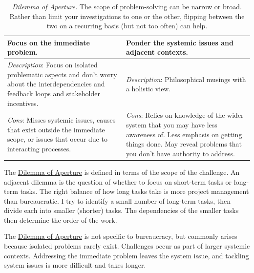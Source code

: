 \begin{center}
\begin{table}[H] %
\begin{tabular}{ | m{\dilemmatablewidth}| m{\dilemmatablewidth} | } 
  \hline
  \textbf{Focus on the immediate problem.} &
  \textbf{Ponder the systemic issues and adjacent contexts.} \\
  \hline
  \textit{Description}: Focus on isolated problematic aspects and don't worry about the interdependencies and feedback loops and stakeholder incentives. &
  \textit{Description}: Philosophical musings with a holistic view. \\
  \hline
  \textit{Cons}: Misses systemic issues, causes that exist outside the immediate scope, or issues that occur due to interacting processes. & 
  \textit{Cons}: Relies on knowledge of the wider system that you may have less awareness of. Less emphasis on getting things done. May reveal problems that you don't have authority to address. \\
  \hline
\end{tabular}
\caption{
\textit{Dilemma of Aperture.}
The scope of problem-solving can be narrow or broad. Rather than limit your investigations to one or the other, flipping between the two on a recurring basis (but not too often) can help.
}
\label{table:dilemma-personal-focus-vs-systemic}
\end{table}
\end{center}

The \hyperref[table:dilemma-personal-focus-vs-systemic]{Dilemma of Aperture} is defined in terms of the scope of the challenge. An adjacent dilemma is the question of whether to focus on short-term tasks or long-term tasks. The right balance of how long tasks take is more project management than bureaucratic. I try to identify a small number of long-term tasks, then divide each into smaller (shorter) tasks. The dependencies of the smaller tasks then determine the order of the work.

The \hyperref[table:dilemma-personal-focus-vs-systemic]{Dilemma of Aperture} is not specific to bureaucracy, but commonly arises because isolated problems rarely exist. Challenges occur as part of larger systemic contexts. Addressing the immediate problem leaves the system issue, and tackling system issues is more difficult and takes longer. 

